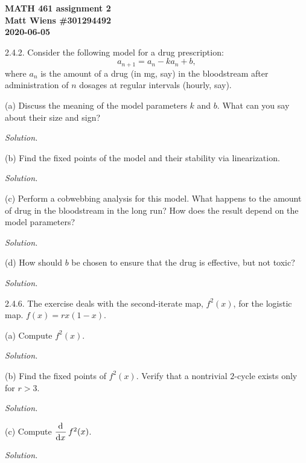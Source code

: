 \documentclass{article}
\begin{document}
\textbf{MATH 461 assignment 2} \\
\textbf{Matt Wiens \#301294492} \\
\textbf{2020-06-05}

2.4.2. Consider the following model for a drug prescription:
%
\begin{equation*}
    a_{n + 1} = a_n - k a_n + b,
\end{equation*}
%
where $a_n$ is the amount of a drug (in mg, say) in the bloodstream
after administration of $n$ dosages at regular intervals (hourly, say).

(a) Discuss the meaning of the model parameters $k$ and $b$. What can
you say about their size and sign?

\textit{Solution.}

\vspace{5mm}

(b) Find the fixed points of the model and their stability via linearization.

\textit{Solution.}

\vspace{5mm}

(c) Perform a cobwebbing analysis for this model. What happens to the
amount of drug in the bloodstream in the long run? How does the result
depend on the model parameters?

\textit{Solution.}

\vspace{5mm}

(d) How should $b$ be chosen to ensure that the drug is effective, but
not toxic?

\textit{Solution.}

\newpage

2.4.6. The exercise deals with the second-iterate map, $f^2(x)$, for the
  logistic map. $f(x) = r x (1 - x)$.

(a) Compute $f^2(x)$.

\textit{Solution.}

\vspace{5mm}

(b) Find the fixed points of $f^2(x)$. Verify that a nontrivial
$2$-cycle exists only for $r > 3$.

\textit{Solution.}

\vspace{5mm}

(c) Compute $\dod{}{x} f^2(x)$.

\textit{Solution.}

\vspace{5mm}
\end{document}
